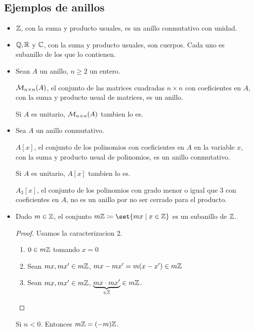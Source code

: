 \subsection{Ejemplos de anillos}
\begin{itemize}
	\item \(\mathbb{Z} \), con la suma y producto usuales, es un anillo conmutativo con unidad.
	\item \(\mathbb{Q}, \mathbb{R} \) y \(\mathbb{C} \), con la suma y producto usuales, son cuerpos. Cada uno es subanillo de los que lo contienen.
	\item Sean \(A \) un anillo, \(n \geq 2 \) un entero.
	      
	      \(\mathcal{\MakeUppercase{m}}_{n \times n }(A )\), el conjunto de las matrices cuadradas \(n \times n \) con coeficientes en \(A \), con la suma y producto usual de matrices, es un anillo.
	      
	      Si \(A \) es unitario, \(\mathcal{\MakeUppercase{m}}_{n \times n}(A )\) tambien lo es.
	      
	\item Sea \(A \) un anillo conmutativo.
	      
	      \(A[x ]\), el conjunto de los polinomios con coeficientes en \(A \) en la variable \(x \), con la suma y producto usual de polinomios, es un anillo conmutativo.
	      
	      Si \(A \) es unitario, \(A[x ]\) tambien lo es.
	      
	      \(A_3[x ]\), el conjunto de los polinomios con grado menor o igual que 3 con coeficientes en \(A \), no es un anillo por no ser cerrado para el producto.
	      
	\item Dado \(m \in \mathbb{Z} \), el conjunto \(m\Z \coloneqq \set{mx \mid x \in \Z }\) es un subanillo de \(\mathbb{Z} \).
	      \begin{proof}
		      Usamos la caracterizacion 2.
		      
		      \begin{enumerate}
			      \item \(0 \in m\mathbb{Z} \) tomando \(x = 0 \)
			      \item Sean \(mx, mx^\prime \in m\mathbb{Z} \), \(mx - mx^\prime = m(x-x^\prime ) \in m\mathbb{Z} \)
			      \item Sean \(mx, mx^\prime \in m\mathbb{Z} \), \(\underbrace{mx \cdot mx^\prime}_{\in \mathbb{Z}} \in m\mathbb{Z} \).
		      \end{enumerate}
		      
	      \end{proof}
	      \begin{remark}
		      Si \(n < 0 \). Entonces \(m\mathbb{Z} = (-m)\mathbb{Z} \).
		      

\end{remark}
\end{itemize}
